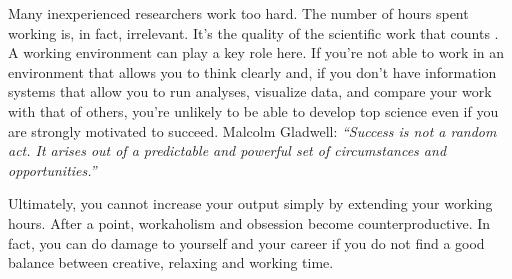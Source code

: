\documentclass[graybox,envcountchap,sectrefs,UStrade]{svmono}
\begin{document}
Many inexperienced researchers work too hard. The number of hours spent working is, in fact, irrelevant. It's the quality of the scientific work that counts \citep{AscheronKickuth2004}. A working environment can play a key role here. If you're not able to work in an environment that allows you to think clearly and, if you don't have information systems that allow you to run analyses, visualize data, and compare your work with that of others, you're unlikely to be able to develop top science even if you are strongly motivated to succeed. Malcolm Gladwell: \emph{``Success is not a random act. It arises out of a predictable and powerful set of circumstances and opportunities.''}\par

Ultimately, you cannot increase your output simply by extending your working hours. After a point, workaholism and obsession become counterproductive. In fact, you can do damage to yourself and your career if you do not find a good balance between creative, relaxing and working time. \par
\end{document}
